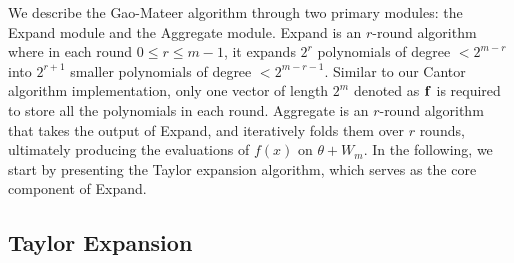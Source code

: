 We describe the Gao-Mateer algorithm through two primary modules: the \textsf{Expand} module and the \textsf{Aggregate} module.  \textsf{Expand} is an $r$-round algorithm where in each round $0 \leq r \leq m - 1$, it expands $2^r$ polynomials of degree $< 2^{m-r}$ into $2^{r+1}$ smaller polynomials of degree $<2^{m-r-1}$. Similar to our Cantor algorithm implementation, only one vector of length $2^m$ denoted as ${\bf{f}}$ is required to store all the polynomials in each round. \textsf{Aggregate} is an $r$-round algorithm that takes the output of \textsf{Expand}, and iteratively folds them over $r$ rounds, ultimately producing the evaluations of $f(x)$ on $\theta + W_m$. In the following, we start by presenting the Taylor expansion algorithm, which serves as the core component of \textsf{Expand}.






\subsection{Taylor Expansion} \label{sec:Taylor Expansion}

